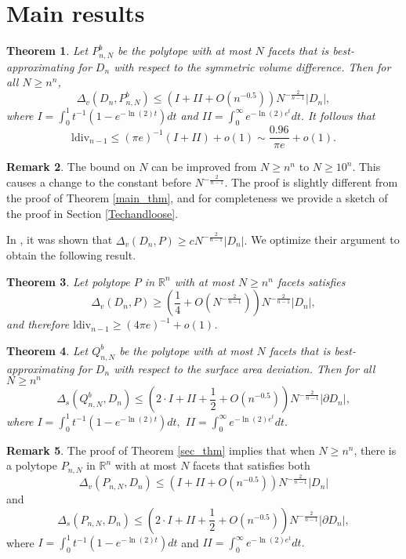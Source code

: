 \documentclass[10pt, twoside, leqno]{article}
\newtheorem{thm}{Theorem}[section]
\theoremstyle{definition}
\newtheorem{remark}[thm]{Remark}
\numberwithin{equation}{section}
\newcommand{\be}{\begin{equation}}
\newcommand{\ee}{\end{equation}}
\newcommand{\R}{\mathbb{R}}
\newcommand{\NN}{N^{-\frac 2{n-1} }}
\begin{document}
	\section{Main results}
\begin{thm}{\label{main_thm}}
	Let $ P^b_{n,N} $  be  the polytope with at most $N$ facets that is best-approximating for $D_n$ with respect to the symmetric volume difference. Then for all $ N \geq n^n $, %
	\be
	\Delta_v(D_n,P^b_{n,N}) \leq \left(I+II+O\left(n^{-0.5}\right)\right)N^{-\frac{2}{n-1}}|D_n|,
	\ee
	where $ I = \int_{0}^{1}t^{-1}(1-e^{-\ln(2)t})dt$ and $ II= \int_{0}^{\infty}e^{-\ln(2)e^{t}}dt.$  It follows that
	\[
		\text{ldiv}_{n-1} \leq (\pi e)^{-1}(I+II) + o(1) \sim \frac{0.96}{\pi e} + o(1).
	\]
\end{thm}
\begin{remark}{\label{niceremark}}
	The bound on $ N$ can be improved from $ N \geq n^n $ to $ N \geq 10^{n}.$ This causes a change to the constant before $ \NN $. The proof is slightly different from the proof of Theorem \ref{main_thm}, and for completeness we provide a sketch of the proof in Section \ref{Techandloose}.%
\end{remark} 
In \cite{Lud06}, it was shown that $ \Delta_v(D_n,P) \geq c\NN|D_n|.$ We optimize their argument to obtain the following result.
\begin{thm}{\label{suprisig}}
	 Let polytope $ P $ in $\R^n$ with at most $ N \geq n^n$ facets satisfies
	\[
	\Delta_v(D_n,P) \geq (\frac{1}{4}+O(\NN))N^{-\frac{2}{n-1}}|D_n|,
	\]
	and therefore $ \text{ldiv}_{n-1} \geq (4\pi e)^{-1} + o\left(1\right)$.  
\end{thm}

\begin{thm}{\label{sec_thm}}
	Let $ Q^b_{n,N} $ be the polytope with at most $N$ facets that is best-approximating for $D_n$ with respect to the surface area deviation. Then for all $ N \geq n^n $
	\be
	\Delta_s\left(Q^b_{n,N}, D_n\right) \leq \left(2\cdot I+II + \frac{1}{2} + O\left(n^{-0.5}\right)\right)\NN|\partial D_n|,
	\ee
	where $ I = \int_{0}^{1}t^{-1}(1-e^{-\ln(2)t})dt,$ $ II= \int_{0}^{\infty}e^{-\ln(2)e^{t}}dt.$
\end{thm}
	\begin{remark}
	The proof of Theorem \ref{sec_thm} implies that when $N\geq n^n$, there is a polytope $ P_{n,N} $ in $ \R^n $ with at most $ N$ facets that satisfies both
		\[
	\Delta_v\left(P_{n,N}, D_n\right) \leq \left(I+II+ O\left(n^{-0.5}\right)\right)N^{-\frac{2}{n-1}}|D_n|
	\]
	and
		\[
	\Delta_s\left(P_{n,N}, D_n\right) \leq \left(2\cdot I+II+ \frac{1}{2} + O\left(n^{-0.5}\right)\right)\NN|\partial D_n|,
	\]
where $ I = \int_{0}^{1}t^{-1}(1-e^{-\ln(2)t})dt$ and $ II= \int_{0}^{\infty}e^{-\ln(2)e^{t}}dt.$
	\end{remark}
\end{document}
